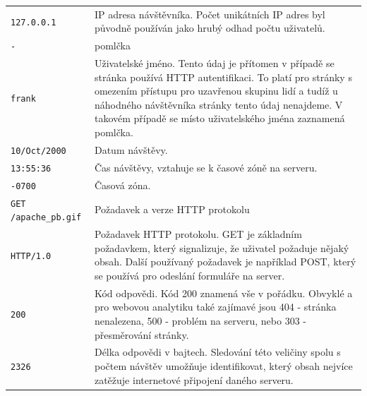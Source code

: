 \documentclass[bc,female,java,dept456]{diploma}						%
\begin{document}
\bigskip

\begin{longtable}{ lp{9cm} }
  \verb!127.0.0.1! & IP adresa návštěvníka. Počet unikátních IP adres byl původně používán jako hrubý odhad počtu uživatelů. \\ \bigskip
  \verb!-! & pomlčka \\ \bigskip
  \verb!frank! & Uživatelské jméno. Tento údaj je přítomen v případě se stránka používá HTTP autentifikaci. To platí pro stránky s omezením přístupu pro uzavřenou skupinu lidí a tudíž u náhodného návštěvníka stránky tento údaj nenajdeme. V takovém případě se místo uživatelského jména zaznamená pomlčka. \\ \bigskip
  \verb!10/Oct/2000! & Datum návštěvy. \\ \bigskip
  \verb!13:55:36! & Čas návštěvy, vztahuje se k časové zóně na serveru. \\ \bigskip  
  
  \verb!-0700! & Časová zóna. \\ \bigskip
  \verb!GET /apache_pb.gif! & Požadavek a verze HTTP protokolu \\ \bigskip
  \verb!HTTP/1.0! & Požadavek HTTP protokolu. GET je základním požadavkem, který signalizuje, že uživatel požaduje nějaký obsah. Další používaný požadavek je například POST, který se používá pro odeslání formuláře na server.  \\ \bigskip
  
  \verb!200! & Kód odpovědi. Kód 200 znamená vše v pořádku. Obvyklé a pro webovou analytiku také zajímavé jsou 404 - stránka nenalezena, 500 - problém na serveru, nebo 303 - přesměrování stránky. \\ \bigskip
  \verb!2326! & Délka odpovědi v bajtech. Sledování této veličiny spolu s počtem návštěv umožňuje identifikovat, který obsah nejvíce zatěžuje internetové připojení daného serveru.
\end{longtable}
\end{document}
